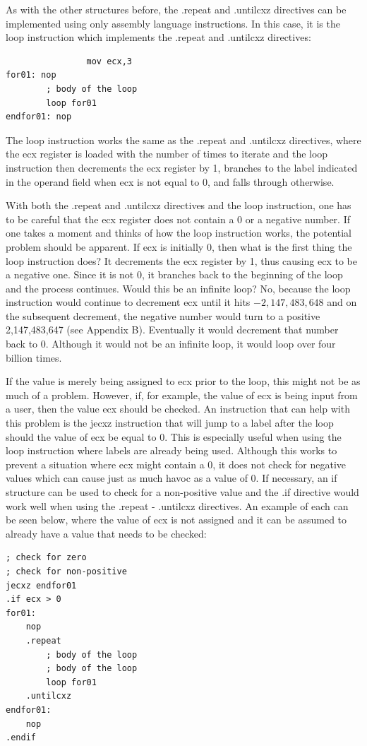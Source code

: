 \documentclass[10pt]{book}
\begin{document}
As with the other structures before, the .repeat and .untilcxz directives can be implemented using only assembly language instructions. In this case, it is the loop instruction which implements the .repeat and .untilcxz directives:
\begin{verbatim}
                mov ecx,3
for01: nop
        ; body of the loop
        loop for01
endfor01: nop
\end{verbatim}

The loop instruction works the same as the .repeat and .untilcxz directives, where the ecx register is loaded with the number of times to iterate and the loop instruction then decrements the ecx register by 1, branches to the label indicated in the operand field when ecx is not equal to 0, and falls through otherwise.

With both the .repeat and .untilcxz directives and the loop instruction, one has to be careful that the ecx register does not contain a 0 or a negative number. If one takes a moment and thinks of how the loop instruction works, the potential problem should be apparent. If ecx is initially 0, then what is the first thing the loop instruction does? It decrements the ecx register by 1, thus causing ecx to be a negative one. Since it is not 0, it branches back to the beginning of the loop and the process continues. Would this be an infinite loop? No, because the loop instruction would continue to decrement ecx until it hits $-2,147,483,648$ and on the subsequent decrement, the negative number would turn to a positive 2,147,483,647 (see Appendix B). Eventually it would decrement that number back to 0. Although it would not be an infinite loop, it would loop over four billion times.

If the value is merely being assigned to ecx prior to the loop, this might not be as much of a problem. However, if, for example, the value of ecx is being input from a user, then the value ecx should be checked. An instruction that can help with this problem is the jecxz instruction that will jump to a label after the loop should the value of ecx be equal to 0. This is especially useful when using the loop instruction where labels are already being used. Although this works to prevent a situation where ecx might contain a 0, it does not check for negative values which can cause just as much havoc as a value of 0. If necessary, an if structure can be used to check for a non-positive value and the .if directive would\\
work well when using the .repeat - .untilcxz directives. An example of each can be seen below, where the value of ecx is not assigned and it can be assumed to already have a value that needs to be checked:
\begin{verbatim}
; check for zero
; check for non-positive
jecxz endfor01
.if ecx > 0
for01:
    nop
    .repeat
        ; body of the loop
        ; body of the loop
        loop for01
    .untilcxz
endfor01:
    nop
.endif
\end{verbatim}
\end{document}
